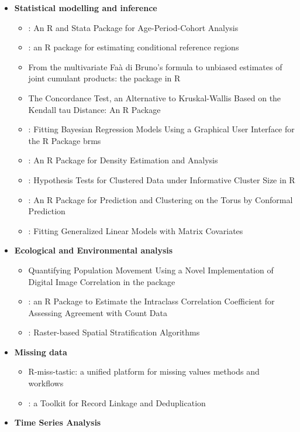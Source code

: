 \begin{itemize}
\tightlist
\item
  \textbf{Statistical modelling and inference}

  \begin{itemize}
  \tightlist
  \item
    : An R and Stata Package for Age-Period-Cohort Analysis
  \item
    : an R package for estimating conditional reference
    regions
  \item
    From the multivariate Faà di Bruno's formula to unbiased estimates
    of joint cumulant products: the  package in R
  \item
    The Concordance Test, an Alternative to Kruskal-Wallis Based on the
    Kendall tau Distance: An R Package
  \item
    : Fitting Bayesian Regression Models Using a
    Graphical User Interface for the R Package brms
  \item
    : An R Package for Density Estimation and Analysis
  \item
    : Hypothesis Tests for Clustered Data under
    Informative Cluster Size in R
  \item
    : An R Package for Prediction and Clustering on the
    Torus by Conformal Prediction
  \item
    : Fitting Generalized Linear Models with Matrix
    Covariates
  \end{itemize}
\item
  \textbf{Ecological and Environmental analysis}

  \begin{itemize}
  \tightlist
  \item
    Quantifying Population Movement Using a Novel Implementation of
    Digital Image Correlation in the  package
  \item
    : an R Package to Estimate the Intraclass Correlation
    Coefficient for Assessing Agreement with Count Data
  \item
    : Raster-based Spatial Stratification Algorithms
  \end{itemize}
\item
  \textbf{Missing data}

  \begin{itemize}
  \tightlist
  \item
    R-miss-tastic: a unified platform for missing values methods and
    workflows
  \item
    : a Toolkit for Record Linkage and Deduplication
  \end{itemize}
\item
  \textbf{Time Series Analysis}


\end{itemize}
